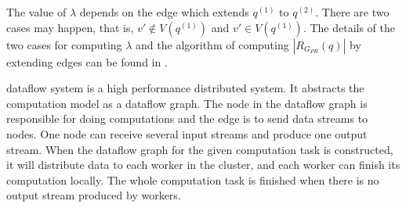 The value of $\lambda$ depends on the edge which extends $q^{(1)}$ to $q^{(2)}$. There are two cases may happen, that is, $v'\not\in V(q^{(1)})$ and $v'\in V(q^{(1)})$. The details of the two cases for computing $\lambda$ and the algorithm of computing $|R_{G_{PR}}(q)|$ by extending edges can be found in \cite{Lai2016}.

 \timely dataflow system is a high performance distributed system. It abstracts the computation model as a dataflow graph. The node in the dataflow graph is responsible for doing computations and the edge is to send data streams to nodes. One node can receive several input streams and produce one output stream. When the dataflow graph for the given computation task is constructed, it will distribute data to each worker in the cluster, and each worker can finish its computation locally. The whole computation task is finished when there is no output stream produced by workers.